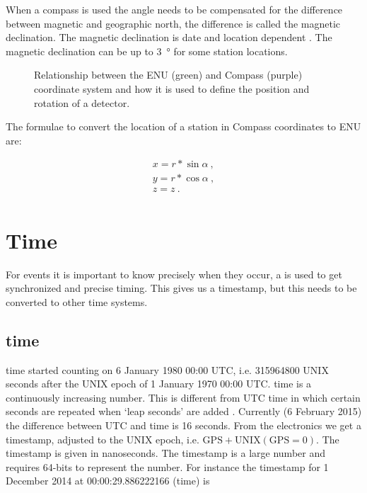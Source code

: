 When a compass is used the angle needs to be compensated for the
difference between magnetic and geographic north, the difference is
called the magnetic declination. The magnetic declination is date and
location dependent \cite{canada:2013aa}. The magnetic declination can be
up to \SI{3}{\degree} for some \hisparc station locations.

\begin{figure}
    \centering
    
    \caption{Relationship between the ENU (green) and Compass (purple)
             coordinate system and how it is used to define the position
             and rotation of a detector.}
    \label{fig:enu_compass}
\end{figure}

The formulae to convert the location of a station in Compass coordinates
to ENU are:

\begin{equation}
    \begin{array}{l}
        x = r * \sin{\alpha} \ , \\
        y = r * \cos{\alpha} \ , \\
        z = z \ . \\
    \end{array}
\end{equation}


\section{Time}

For \hisparc events it is important to know precisely when
they occur, a \gps is used to get synchronized and precise timing. This
gives us a timestamp, but this needs to be converted to other time
systems.


\subsection{\gps time}

\gps time started counting on 6 January 1980 00:00 UTC, i.e.
\num{315964800} UNIX seconds after the UNIX epoch of 1 January 1970
00:00 UTC. \gps time is a continuously increasing number. This is
different from UTC time in which certain seconds are repeated when `leap
seconds' are added \cite{usno:2012aa}. Currently (6 February 2015) the
difference between UTC and \gps time is 16 seconds. From the \hisparc
electronics we get a \gps timestamp, adjusted to the UNIX epoch, i.e.
$\mathrm{GPS} + \mathrm{UNIX(GPS=0)}$. The timestamp is given in
nanoseconds. The \gps timestamp is a large number and requires 64-bits
to represent the number. For instance the \gps timestamp for 1 December
2014 at 00:00:29.886222166 (\gps time) is

